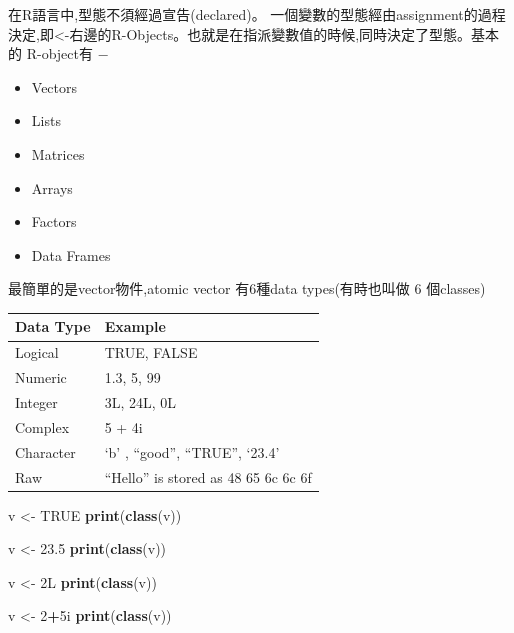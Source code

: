 \documentclass[]{book}
\newenvironment{Shaded}{\begin{snugshade}}{\end{snugshade}}
\newcommand{\DecValTok}[1]{\textcolor[rgb]{0.00,0.00,0.81}{#1}}
\newcommand{\FloatTok}[1]{\textcolor[rgb]{0.00,0.00,0.81}{#1}}
\newcommand{\KeywordTok}[1]{\textcolor[rgb]{0.13,0.29,0.53}{\textbf{#1}}}
\newcommand{\NormalTok}[1]{#1}
\newcommand{\OperatorTok}[1]{\textcolor[rgb]{0.81,0.36,0.00}{\textbf{#1}}}
\newcommand{\OtherTok}[1]{\textcolor[rgb]{0.56,0.35,0.01}{#1}}
\newcommand{\StringTok}[1]{\textcolor[rgb]{0.31,0.60,0.02}{#1}}
\providecommand{\tightlist}{%
  \setlength{\itemsep}{0pt}\setlength{\parskip}{0pt}}
\theoremstyle{definition}
\theoremstyle{definition}
\theoremstyle{definition}
\theoremstyle{remark}
\begin{document}
在R語言中,型態不須經過宣告(declared)。
一個變數的型態經由assignment的過程決定,即\textless{}-右邊的R-Objects。也就是在指派變數值的時候,同時決定了型態。基本的
R-object有 −

\begin{itemize}
\tightlist
\item
  Vectors\\
\item
  Lists\\
\item
  Matrices
\item
  Arrays
\item
  Factors
\item
  Data Frames
\end{itemize}

最簡單的是vector物件,atomic vector 有6種data types(有時也叫做 6
個classes)

\begin{longtable}[]{@{}ll@{}}
\toprule
Data Type & Example\tabularnewline
\midrule
\endhead
Logical & TRUE, FALSE\tabularnewline
Numeric & 1.3, 5, 99\tabularnewline
Integer & 3L, 24L, 0L\tabularnewline
Complex & 5 + 4i\tabularnewline
Character & `b' , ``good'', ``TRUE'', `23.4'\tabularnewline
Raw & ``Hello'' is stored as 48 65 6c 6c 6f\tabularnewline
\bottomrule
\end{longtable}

\begin{Shaded}
\begin{Highlighting}[]
\NormalTok{v <-}\StringTok{ }\OtherTok{TRUE} 
\KeywordTok{print}\NormalTok{(}\KeywordTok{class}\NormalTok{(v))}
\end{Highlighting}
\end{Shaded}

\begin{Shaded}
\begin{Highlighting}[]
\NormalTok{v <-}\StringTok{ }\FloatTok{23.5}
\KeywordTok{print}\NormalTok{(}\KeywordTok{class}\NormalTok{(v))}
\end{Highlighting}
\end{Shaded}

\begin{Shaded}
\begin{Highlighting}[]
\NormalTok{v <-}\StringTok{ }\NormalTok{2L}
\KeywordTok{print}\NormalTok{(}\KeywordTok{class}\NormalTok{(v))}
\end{Highlighting}
\end{Shaded}

\begin{Shaded}
\begin{Highlighting}[]
\NormalTok{v <-}\StringTok{ }\DecValTok{2}\OperatorTok{+}\NormalTok{5i}
\KeywordTok{print}\NormalTok{(}\KeywordTok{class}\NormalTok{(v))}
\end{Highlighting}
\end{Shaded}
\end{document}
